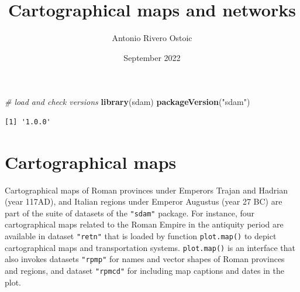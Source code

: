 \documentclass[a4paper,11pt]{memoir}
\title{Cartographical maps and networks}
\author{Antonio Rivero Ostoic}
\date{September 2022}
\newenvironment{Shaded}{\begin{snugshade}}{\end{snugshade}}
\newcommand{\CommentTok}[1]{\textcolor[rgb]{0.56,0.35,0.01}{\textit{#1}}}
\newcommand{\DataTypeTok}[1]{\textcolor[rgb]{0.13,0.29,0.53}{#1}}
\newcommand{\KeywordTok}[1]{\textcolor[rgb]{0.13,0.29,0.53}{\textbf{#1}}}
\newcommand{\NormalTok}[1]{#1}
\newcommand{\OperatorTok}[1]{\textcolor[rgb]{0.81,0.36,0.00}{\textbf{#1}}}
\newcommand{\StringTok}[1]{\textcolor[rgb]{0.31,0.60,0.02}{#1}}
\begin{document}
\maketitle

%   
%   

\begin{Shaded}
\begin{Highlighting}[]
\CommentTok{# load and check versions}
\KeywordTok{library}\NormalTok{(sdam)}
\KeywordTok{packageVersion}\NormalTok{(}\StringTok{"sdam"}\NormalTok{)}
\end{Highlighting}
\end{Shaded}

\begin{verbatim}
[1] '1.0.0'
\end{verbatim}

\hypertarget{cartographical-maps}{%
\section{Cartographical maps}\label{cartographical-maps}}

Cartographical maps of Roman provinces under Emperors Trajan and Hadrian
(year 117AD), and Italian regions under Emperor Augustus (year 27 BC)
are part of the suite of datasets of the \texttt{"sdam"} package. For
instance, four cartographical maps related to the Roman Empire in the
antiquity period are available in dataset \texttt{"retn"} that is loaded
by function \texttt{plot.map()} to depict cartographical maps and
transportation systems. \texttt{plot.map()} is an interface that also
invokes datasets \texttt{"rpmp"} for names and vector shapes of Roman
provinces and regions, and dataset \texttt{"rpmcd"} for including map
captions and dates in the plot.
\end{document}
